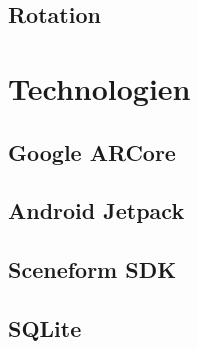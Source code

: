 \subsection{Rotation}

\section{Technologien}
\label{chap:Technologien}
\subsection{Google ARCore}
\subsection{Android Jetpack}
\subsection{Sceneform SDK}
\subsection{SQLite}

